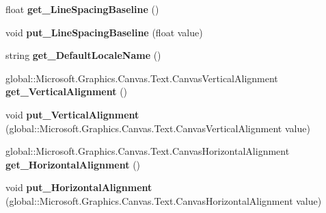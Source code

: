 \begin{DoxyCompactItemize}
\mbox{\label{class_microsoft_1_1_graphics_1_1_canvas_1_1_text_1_1_canvas_text_layout_a42141c8d17b56df867588b4c899cc69b}} 
float {\bfseries get\+\_\+\+Line\+Spacing\+Baseline} ()
\item 
\mbox{\label{class_microsoft_1_1_graphics_1_1_canvas_1_1_text_1_1_canvas_text_layout_a99e3ed24c59e7bfd54565cc446c0c953}} 
void {\bfseries put\+\_\+\+Line\+Spacing\+Baseline} (float value)
\item 
\mbox{\label{class_microsoft_1_1_graphics_1_1_canvas_1_1_text_1_1_canvas_text_layout_aadc5db8c747feb51e16332edb9439baf}} 
string {\bfseries get\+\_\+\+Default\+Locale\+Name} ()
\item 
\mbox{\label{class_microsoft_1_1_graphics_1_1_canvas_1_1_text_1_1_canvas_text_layout_adeddc6c9b2e6402b8d8645e0a439a2dd}} 
global\+::\+Microsoft.\+Graphics.\+Canvas.\+Text.\+Canvas\+Vertical\+Alignment {\bfseries get\+\_\+\+Vertical\+Alignment} ()
\item 
\mbox{\label{class_microsoft_1_1_graphics_1_1_canvas_1_1_text_1_1_canvas_text_layout_a62984a3697135681afc6b8776f3df132}} 
void {\bfseries put\+\_\+\+Vertical\+Alignment} (global\+::\+Microsoft.\+Graphics.\+Canvas.\+Text.\+Canvas\+Vertical\+Alignment value)
\item 
\mbox{\label{class_microsoft_1_1_graphics_1_1_canvas_1_1_text_1_1_canvas_text_layout_a3b97a0cf1741dc7db0af0729a4a4fd99}} 
global\+::\+Microsoft.\+Graphics.\+Canvas.\+Text.\+Canvas\+Horizontal\+Alignment {\bfseries get\+\_\+\+Horizontal\+Alignment} ()
\item 
\mbox{\label{class_microsoft_1_1_graphics_1_1_canvas_1_1_text_1_1_canvas_text_layout_a58b83f1637a8f391083f54a8aa4458be}} 
void {\bfseries put\+\_\+\+Horizontal\+Alignment} (global\+::\+Microsoft.\+Graphics.\+Canvas.\+Text.\+Canvas\+Horizontal\+Alignment value)

\end{DoxyCompactItemize}
